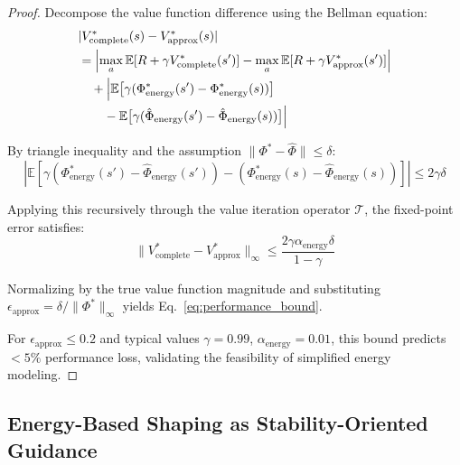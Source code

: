 \documentclass[journal]{IEEEtran}
\begin{document}
	\begin{proof}
		Decompose the value function difference using the Bellman equation:
		\begin{align}
			&|V^*_{\text{complete}}(s) - V^*_{\text{approx}}(s)| \notag\\
			&= \left|\max_a \mathbb{E}[R + \gamma V^*_{\text{complete}}(s')] - \max_a \mathbb{E}[R + \gamma V^*_{\text{approx}}(s')]\right| \notag\\
			&\quad + \Big|\mathbb{E}\big[\gamma(\Phi^*_{\text{energy}}(s') - \Phi^*_{\text{energy}}(s))\big] \notag\\
			&\qquad - \mathbb{E}\big[\gamma(\hat{\Phi}_{\text{energy}}(s') - \hat{\Phi}_{\text{energy}}(s))\big]\Big|
			\label{eq:value_diff}
		\end{align}
		
		By triangle inequality and the assumption $\|\Phi^* - \hat{\Phi}\| \leq \delta$:
		\begin{equation}
			\left|\mathbb{E}[\gamma(\Phi^*_{\text{energy}}(s') - \hat{\Phi}_{\text{energy}}(s')) - (\Phi^*_{\text{energy}}(s) - \hat{\Phi}_{\text{energy}}(s))]\right| \leq 2\gamma\delta
		\end{equation}
		
		Applying this recursively through the value iteration operator $\mathcal{T}$, the fixed-point error satisfies:
		\begin{equation}
			\|V^*_{\text{complete}} - V^*_{\text{approx}}\|_\infty \leq \frac{2\gamma\alpha_{\text{energy}}\delta}{1-\gamma}
		\end{equation}
		
		Normalizing by the true value function magnitude and substituting $\epsilon_{\text{approx}}=\delta/\|\Phi^*\|_\infty$ yields Eq.~\eqref{eq:performance_bound}.
		
		For $\epsilon_{\text{approx}} \leq 0.2$ and typical values $\gamma=0.99$, $\alpha_{\text{energy}}=0.01$, this bound predicts $<5\%$ performance loss, validating the feasibility of simplified energy modeling.
	\end{proof}
	
	\subsection{Energy-Based Shaping as Stability-Oriented Guidance}
	
\end{document}
